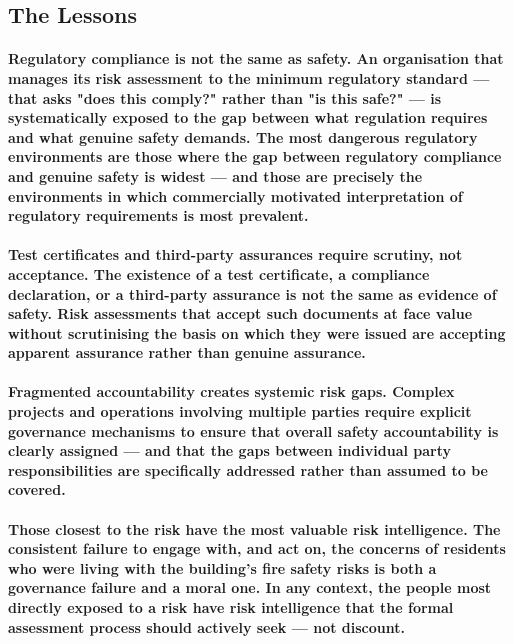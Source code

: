 \subsection{The Lessons}
\paragraph{\textbf{Regulatory compliance is not the same as safety}. An organisation that manages its risk assessment to the minimum regulatory standard — that asks "does this comply?" rather than "is this safe?" — is systematically exposed to the gap between what regulation requires and what genuine safety demands. The most dangerous regulatory environments are those where the gap between regulatory compliance and genuine safety is widest — and those are precisely the environments in which commercially motivated interpretation of regulatory requirements is most prevalent.}
\paragraph{\textbf{Test certificates and third-party assurances require scrutiny, not acceptance}. The existence of a test certificate, a compliance declaration, or a third-party assurance is not the same as evidence of safety. Risk assessments that accept such documents at face value without scrutinising the basis on which they were issued are accepting apparent assurance rather than genuine assurance.}
\paragraph{\textbf{Fragmented accountability creates systemic risk gaps}. Complex projects and operations involving multiple parties require explicit governance mechanisms to ensure that overall safety accountability is clearly assigned — and that the gaps between individual party responsibilities are specifically addressed rather than assumed to be covered.}
\paragraph{\textbf{Those closest to the risk have the most valuable risk intelligence}. The consistent failure to engage with, and act on, the concerns of residents who were living with the building's fire safety risks is both a governance failure and a moral one. In any context, the people most directly exposed to a risk have risk intelligence that the formal assessment process should actively seek — not discount.}

